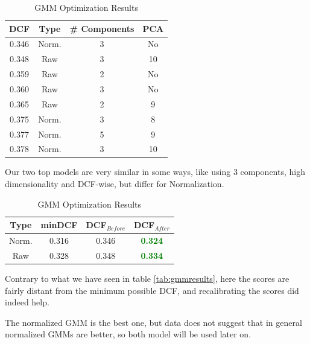 \documentclass[12pt, twocolumn]{article}
\begin{document}
\begin{table}[H] 
    \centering
    \begin{tabular}{||c|c|c|c||}
        \hline
        DCF & Type & \# Components & PCA \\
        \hline
        \hline
        0.346 & Norm. & 3 & No \\ 
        0.348 & Raw & 3 &  10 \\
        0.359 & Raw & 2 &  No \\
        0.360 & Raw & 3 &  No \\
        0.365 & Raw & 2 &  9  \\
        0.375 & Norm. & 3 & 8 \\ 
        0.377 & Norm. & 5 & 9 \\ 
        0.378 & Norm. & 3 & 10 \\ 
        \hline
    \end{tabular}
    \caption{GMM Optimization Results}
    \label{tab:gmmoptimization}
\end{table}

Our two top models are very similar in some ways, like using 3 components, high dimensionality and DCF-wise, but differ for Normalization.

\begin{table}[H] 
    \centering
    \begin{tabular}{||c|c|c|c||}
        \hline
        Type & minDCF & DCF$_{Before}$ & DCF$_{After}$ \\
        \hline
        \hline
        Norm. & 0.316 & 0.346 & \textcolor{green}{\bf 0.324} \\
        Raw & 0.328 & 0.348 & \textcolor{green}{\bf 0.334} \\
        \hline
    \end{tabular}
    \caption{GMM Optimization Results}
    \label{tab:gmmcalibration}
\end{table}

Contrary to what we have seen in table \ref{tab:gmmresults}, here the scores are fairly distant from the minimum possible DCF, and recalibrating the scores did indeed help.

The normalized GMM is the best one, but data does not suggest that in general normalized GMMs are better, so both model will be used later on.
\end{document}
